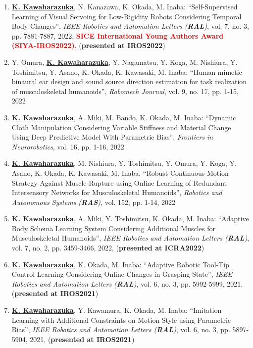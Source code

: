 \documentclass[letterpaper]{article}
\begin{document}
\begin{enumerate}
\item \underline{\textbf{K. Kawaharazuka}}, N. Kanazawa, K. Okada, M. Inaba: ``Self-Supervised Learning of Visual Servoing for Low-Rigidity Robots Considering Temporal Body Changes'', \textit{IEEE Robotics and Automation Letters (\textit{\textbf{RAL}})}, vol. 7, no. 3, pp. 7881-7887, 2022, \textbf{\textcolor{red}{SICE International Young Authors Award (SIYA-IROS2022)}}, (\textbf{presented at IROS2022})
\item Y. Omura, \underline{\textbf{K. Kawaharazuka}}, Y. Nagamatsu, Y. Koga, M. Nishiura, Y. Toshimitsu, Y. Asano, K. Okada, K. Kawasaki, M. Inaba: ``Human-mimetic binaural ear design and sound source direction estimation for task realization of musculoskeletal humanoids'', \textit{Robomech Journal}, vol. 9, no. 17, pp. 1-15, 2022
\item \underline{\textbf{K. Kawaharazuka}}, A. Miki, M. Bando, K. Okada, M. Inaba: ``Dynamic Cloth Manipulation Considering Variable Stiffness and Material Change Using Deep Predictive Model With Parametric Bias'', \textit{Frontiers in Neurorobotics}, vol. 16, pp. 1-16, 2022
\item \underline{\textbf{K. Kawaharazuka}}, M. Nishiura, Y. Toshimitsu, Y. Omura, Y. Koga, Y. Asano, K. Okada, K. Kawasaki, M. Inaba: ``Robust Continuous Motion Strategy Against Muscle Rupture using Online Learning of Redundant Intersensory Networks for Musculoskeletal Humanoids'', \textit{Robotics and Autonomous Systems (\textit{\textbf{RAS}})}, vol. 152, pp. 1-14, 2022
\item \underline{\textbf{K. Kawaharazuka}}, A. Miki, Y. Toshimitsu, K. Okada, M. Inaba: ``Adaptive Body Schema Learning System Considering Additional Muscles for Musculoskeletal Humanoids'', \textit{IEEE Robotics and Automation Letters (\textit{\textbf{RAL}})}, vol. 7, no. 2, pp. 3459-3466, 2022, (\textbf{presented at ICRA2022})
\item \underline{\textbf{K. Kawaharazuka}}, K. Okada, M. Inaba: ``Adaptive Robotic Tool-Tip Control Learning Considering Online Changes in Grasping State'', \textit{IEEE Robotics and Automation Letters (\textit{\textbf{RAL}})}, vol. 6, no. 3, pp. 5992-5999, 2021, (\textbf{presented at IROS2021})
\item \underline{\textbf{K. Kawaharazuka}}, Y. Kawamura, K. Okada, M. Inaba: ``Imitation Learning with Additional Constraints on Motion Style using Parametric Bias'', \textit{IEEE Robotics and Automation Letters (\textit{\textbf{RAL}})}, vol. 6, no. 3, pp. 5897-5904, 2021, (\textbf{presented at IROS2021})

\end{enumerate}
\end{document}

